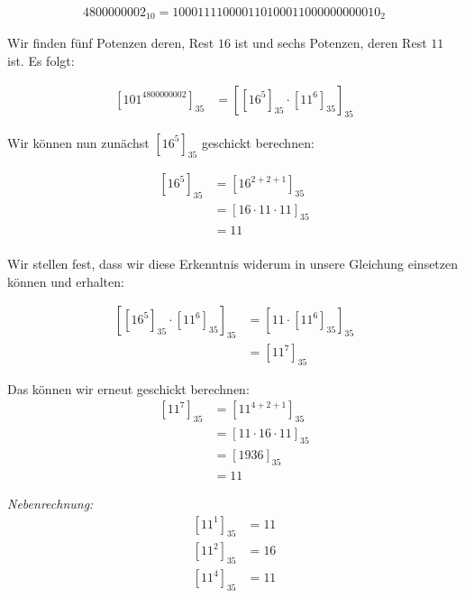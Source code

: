 \documentclass{../crypto}
\begin{document}
\begin{align*}4800000002_{10} = 100011110000110100011000000000010_2\end{align*}

Wir finden fünf Potenzen deren, Rest $16$ ist und sechs Potenzen, deren Rest $11$ 
ist. Es folgt:

\begin{align*}
  \left[101^{4800000002}\right]_{35} &= \left[ \left[16^5\right]_{35} 
                                         \cdot \left[11^6\right]_{35}
                                        \right]_{35}
\end{align*}

Wir können nun zunächst $\left[16^5\right]_{35}$ geschickt berechnen:

\begin{align*}
  \left[16^5\right]_{35} &= \left[16^{2+2+1}\right]_{35} \\
                         &= \left[16 \cdot 11 \cdot 11\right]_{35} \\
                         &= 11 \\
\end{align*}

Wir stellen fest, dass wir diese Erkenntnis widerum in unsere Gleichung 
einsetzen können und erhalten:

\begin{align*}
  \left[ \left[16^5\right]_{35} \cdot \left[11^6\right]_{35} \right]_{35} 
                    &= \left[11 \cdot \left[11^6\right]_{35} \right]_{35} \\
                    &= \left[11^7\right]_{35}
\end{align*}

Das können wir erneut geschickt berechnen:
\begin{align*}
  \left[11^{7}\right]_{35} &= \left[11^{4+2+1}\right]_{35} \\
                           &= \left[11 \cdot 16 \cdot 11\right]_{35} \\
                           &= \left[1936\right]_{35} \\
                           &= 11
\end{align*}
  
\emph{Nebenrechnung:}
\begin{align*}
  \left[11^{1}\right]_{35} &= 11 \\
  \left[11^{2}\right]_{35} &= 16 \\
  \left[11^{4}\right]_{35} &= 11
\end{align*}
\end{document}

